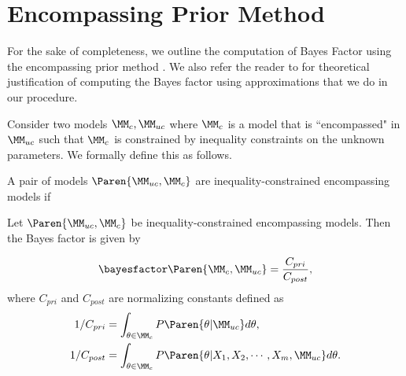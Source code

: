 \section{Encompassing Prior Method}

For the sake of completeness, we outline the computation of Bayes Factor using the encompassing prior method \cite{KlugkistKH05}. We also refer the reader to \cite{HeckDavisStrober19} for theoretical justification of computing the Bayes factor using approximations that we do in our procedure. 

Consider two models $\MM_{c}, \MM_{uc}$ where $\MM_{c}$ is a model that is ``encompassed" in $\MM_{uc}$ such that $\MM_{c}$ is constrained by inequality constraints on the unknown parameters. We formally define this as follows. 

\begin{definition}
    A pair of models $\Paren{\MM_{uc},\MM_{c}}$ are inequality-constrained encompassing models if 
\end{definition}

\begin{proposition}\label{prop:BFencompassing}
Let $\Paren{\MM_{uc},\MM_{c}}$ be inequality-constrained encompassing models. Then the Bayes factor is given by 

\begin{equation}
    \bayesfactor\Paren{\MM_{c},\MM_{uc}} = \frac{C_{pri}}{C_{post}},
\end{equation}
where $C_{pri}$ and $C_{post}$ are normalizing constants defined as 
\begin{align}\label{eq:normalizingconstants}
1/C_{pri} &= \int_{\theta \in \MM_{c}} P\Paren{\theta|\MM_{uc}} d\theta, \\
1/C_{post} &= \int_{\theta \in \MM_{c}} P\Paren{\theta|X_1,X_2, \cdots, X_m, \MM_{uc}} d\theta.
\end{align}
\end{proposition}

